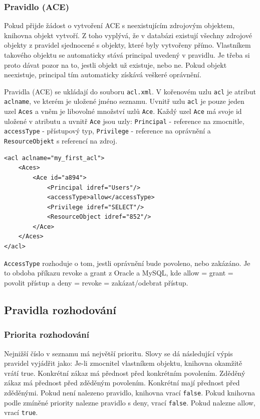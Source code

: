 \subsubsection{Pravidlo (ACE)}

Pokud přijde žádost o vytvoření ACE s neexistujícím zdrojovým objektem, knihovna objekt vytvoří. Z toho vyplývá, že v databázi existují všechny zdrojové objekty z pravidel sjednocené s objekty, které byly vytvořeny přímo. Vlastníkem takového objektu se automaticky stává principal uvedený v pravidlu. Je třeba si proto dávat pozor na to, jestli objekt už existuje, nebo ne. Pokud objekt neexistuje, principal tím automaticky získává veškeré oprávnění.

Pravidla (ACE) se ukládají do souboru \verb|acl.xml|. V kořenovém uzlu \verb|acl| je atribut \verb|aclname|, ve kterém je uložené jméno seznamu. Uvnitř uzlu \verb|acl| je pouze jeden uzel \verb|Aces| a vněm je libovolné množství uzlů \verb|Ace|. Každý uzel \verb|Ace| má svoje id uložené v atributu a uvnitř \verb|Ace| jsou uzly: \verb|Principal| - reference na zmocnitle, \verb|accessType| - přístupový typ, \verb|Privilege| - reference na oprávnění a \verb|ResourceObjekt| s referencí na zdroj.

\begin{lstlisting}
<acl aclname="my_first_acl">
    <Aces>
        <Ace id="a894">
            <Principal idref="Users"/>
            <accessType>allow</accessType>
            <Privilege idref="SELECT"/>
            <ResourceObject idref="852"/>
        </Ace>
    </Aces>
</acl>
\end{lstlisting}

\verb|AccessType| rozhoduje o tom, jestli oprávnění bude povoleno, nebo zakázáno. Je to obdoba příkazu revoke a grant z Oracle a MySQL, kde allow = grant = povolit přístup a deny = revoke = zakázat/odebrat přístup.


\subsection{Pravidla rozhodování}
\subsubsection{Priorita rozhodování}
\label{Priorita rozhodování}

Nejnižší číslo v seznamu má největší prioritu. Slovy se dá následující výpis pravidel vyjádřit jako: Je-li zmocnitel vlastníkem objektu, knihovna okamžitě vrátí true. Konkrétní zákaz má přednost před konkrétním povolením. Zděděný zákaz má přednost před zděděným povolením. Konkrétní mají přednost před zděděnými. Pokud není nalezeno pravidlo, knihovna vrací \verb|false|. Pokud knihovna podle zmíněné priority nalezne pravidlo s deny, vrací \verb|false|. Pokud nalezne allow, vrací \verb|true|.

